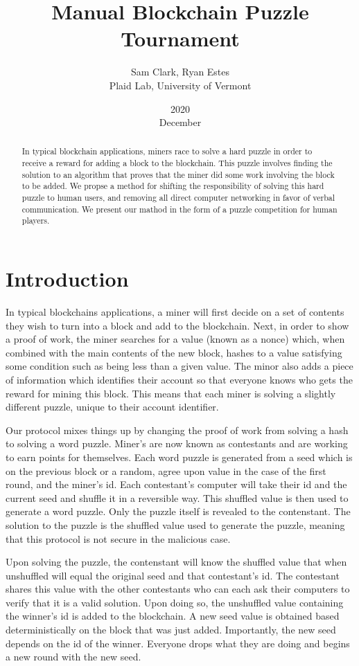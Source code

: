 \documentclass[leqno,12pt]{article}
\title{Manual Blockchain Puzzle Tournament}
\date{2020\\ December}
\author{Sam Clark, Ryan Estes\\ Plaid Lab, University of Vermont}
\begin{document}
\maketitle

\begin{abstract}
  In typical blockchain applications, miners race to solve a hard puzzle in order to receive a reward for adding a block to the blockchain. This puzzle involves finding the solution to an algorithm that proves that the miner did some work involving the block to be added. We propse a method for shifting the responsibility of solving this hard puzzle to human users, and removing all direct computer networking in favor of verbal communication. We present our mathod in the form of a puzzle competition for human players.
\end{abstract}
  
\section{Introduction}

In typical blockchains applications, a miner will first decide on a set of contents they wish to turn into a block and add to the blockchain. Next, in order to show a proof of work, the miner searches for a value (known as a nonce) which, when combined with the main contents of the new block, hashes to a value satisfying some condition such as being less than a given value. The minor also adds a piece of information which identifies their account so that everyone knows who gets the reward for mining this block.\cite{block} This means that each miner is solving a slightly different puzzle, unique to their account identifier.

Our protocol mixes things up by changing the proof of work from solving a hash to solving a word puzzle. Miner's are now known as contestants and are working to earn points for themselves. Each word puzzle is generated from a seed which is on the previous block or a random, agree upon value in the case of the first round, and the miner's id. Each contestant's computer will take their id and the current seed and shuffle it in a reversible way. This shuffled value is then used to generate a word puzzle. Only the puzzle itself is revealed to the contenstant. The solution to the puzzle is the shuffled value used to generate the puzzle, meaning that this protocol is not secure in the malicious case.

Upon solving the puzzle, the contenstant will know the shuffled value that when unshuffled will equal the original seed and that contestant's id. The contestant shares this value with the other contestants who can each ask their computers to verify that it is a valid solution. Upon doing so, the unshuffled value containing the winner's id is added to the blockchain. A new seed value is obtained based deterministically on the block that was just added. Importantly, the new seed depends on the id of the winner. Everyone drops what they are doing and begins a new round with the new seed.
\end{document}
